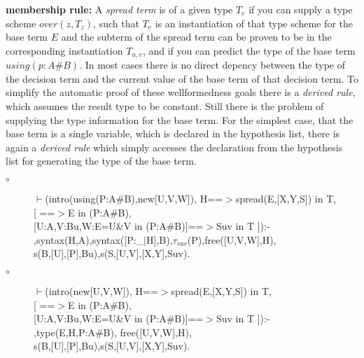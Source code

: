 \documentclass[11pt]{report}
\begin{document}
\begin{enumerate}
 {\bf membership rule:}
 A \emph{spread term} is of a given type $T_e$ if you can
 supply a type scheme $over(z,T_z)$, such that $T_e$ is an
 instantiation of that type scheme for the base term $E$ and 
 the subterm of the spread term can be proven to be in the 
 corresponding instantiation $T_{u,v}$, and if you can predict the
 type of the base term $using(p:A\#B)$. 
 In most cases there is no direct
 depency between the type of the decision term and the current
 value of the base term of that decision term. To simplify
 the automatic proof of these wellformedness goals there is
 a \emph{derived rule}, which assumes the result type to be constant.
 Still there is the problem of
 supplying the type information for the base term. For the
 simplest case, that the base term is a single variable, which
 is declared in the hypothesis list, there is again a \emph{derived 
 rule} which simply accesses the declaration from the hypothesis
 list for generating the type of the base term.
 \begin{description}
 \item[$\circ$]
\begin{sf}\begin{tabbing}
$\vdash$(intro(using(P:A\#B),new[U,V,W]), H==$>$spread(E,[X,Y,S]) in T,\\[-0.15ex]
\hspace{2em}[ ==$>$E in (P:A\#B), \\[-0.15ex]
\hspace{3em}[U:A,V:Bu,W:E=U\&V in (P:A\#B)]==$>$Suv in T ]):-\\[-0.15ex]
\hspace{2em}{\bf derived},syntax(H,A),syntax([P:\_\hspace{0.1em}$\mid$H],B),$\tau_{var}$(P),free([U,V,W],H),\\[-0.15ex]
\hspace{2em}s(B,[U],[P],Bu),s(S,[U,V],[X,Y],Suv).
\end{tabbing}\end{sf}

 \item[$\circ$]
\begin{sf}\begin{tabbing}
$\vdash$(intro(new[U,V,W]), H==$>$spread(E,[X,Y,S]) in T,\\[-0.15ex]
\hspace{2em}[ ==$>$E in (P:A\#B),\\[-0.15ex]
\hspace{3em}[U:A,V:Bu,W:E=U\&V in (P:A\#B)]==$>$Suv in T ]):-\\[-0.15ex]
\hspace{2em}{\bf derived},type(E,H,P:A\#B), free([U,V,W],H),\\[-0.15ex]
\hspace{2em}s(B,[U],[P],Bu),s(S,[U,V],[X,Y],Suv).
\end{tabbing}\end{sf}

 \end{description}
 \end{enumerate}
  
\end{document}
